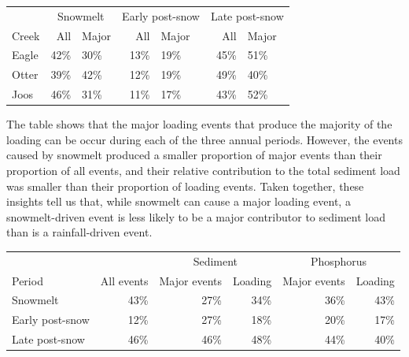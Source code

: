 \documentclass[12pt]{article}
\begin{document}
\begin{table}[h]
    \begin{center}
    \begin{tabular}{lr|lr|lr|l}
        & \multicolumn{2}{c}{Snowmelt    }\ & \multicolumn{2}{c}{Early post-snow}\ & \multicolumn{2}{c}{Late post-snow} \\
        Creek & All & Major & All & Major & All & Major \\
        \hline 
        Eagle & 42\% & 30\% & 13\% & 19\% & 45\% & 51\% \\
        Otter & 39\% & 42\% & 12\% & 19\% & 49\% & 40\% \\
        Joos & 46\% & 31\% & 11\% & 17\% & 43\% & 52\% \\
        
    \end{tabular}
    \end{center}
\end{table}



The table shows that the major loading events that produce the majority of the loading can be occur during each of the three annual periods. However, the events caused by snowmelt produced a smaller proportion of major events than their proportion of all events, and their relative contribution to the total sediment load was smaller than their proportion of loading events. Taken together, these insights tell us that, while snowmelt can cause a major loading event, a snowmelt-driven event is less likely to be a major contributor to sediment load than is a rainfall-driven event.\\



\begin{table}[h]
    \begin{center}
    \begin{tabular}{lrrrrr}
        &  & \multicolumn{2}{c}{Sediment} & \multicolumn{2}{c}{Phosphorus} \\
        Period & All events & Major events & Loading & Major events & Loading \\
        \hline 
        Snowmelt & 
        43\% &
        27\% & 
        34\% & 
        36\% & 
        43\% \\
        Early post-snow & 
        12\% &
        27\% & 
        18\% & 
        20\% & 
        17\% \\
        Late post-snow & 
        46\% &
        46\% & 
        48\% & 
        44\% & 
        40\% \\
    \end{tabular}
    \end{center}
\end{table}
\end{document}
